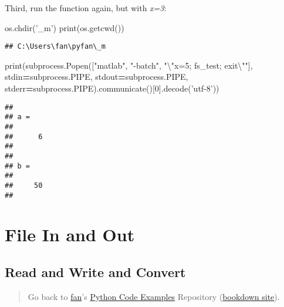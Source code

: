 \documentclass[
]{book}
\newenvironment{Shaded}{\begin{snugshade}}{\end{snugshade}}
\newcommand{\BuiltInTok}[1]{#1}
\newcommand{\CharTok}[1]{\textcolor[rgb]{0.31,0.60,0.02}{#1}}
\newcommand{\DecValTok}[1]{\textcolor[rgb]{0.00,0.00,0.81}{#1}}
\newcommand{\NormalTok}[1]{#1}
\newcommand{\OperatorTok}[1]{\textcolor[rgb]{0.81,0.36,0.00}{\textbf{#1}}}
\newcommand{\StringTok}[1]{\textcolor[rgb]{0.31,0.60,0.02}{#1}}
\begin{document}
Third, run the function again, but with \emph{x=3}:

\begin{Shaded}
\begin{Highlighting}[]
\NormalTok{os.chdir(}\StringTok{'_m'}\NormalTok{)}
\BuiltInTok{print}\NormalTok{(os.getcwd())}
\end{Highlighting}
\end{Shaded}

\begin{verbatim}
## C:\Users\fan\pyfan\_m
\end{verbatim}

\begin{Shaded}
\begin{Highlighting}[]
\BuiltInTok{print}\NormalTok{(subprocess.Popen([}\StringTok{"matlab"}\NormalTok{, }\StringTok{"-batch"}\NormalTok{, }\StringTok{"}\CharTok{\textbackslash{}"}\StringTok{x=5; fs_test; exit}\CharTok{\textbackslash{}"}\StringTok{"}\NormalTok{],}
\NormalTok{                       stdin}\OperatorTok{=}\NormalTok{subprocess.PIPE,}
\NormalTok{                       stdout}\OperatorTok{=}\NormalTok{subprocess.PIPE,}
\NormalTok{                       stderr}\OperatorTok{=}\NormalTok{subprocess.PIPE).communicate()[}\DecValTok{0}\NormalTok{].decode(}\StringTok{'utf-8'}\NormalTok{))}
\end{Highlighting}
\end{Shaded}

\begin{verbatim}
## 
## a =
## 
##      6
## 
## 
## b =
## 
##     50
## 
\end{verbatim}

\hypertarget{file-in-and-out}{%
\section{File In and Out}\label{file-in-and-out}}

\hypertarget{read-and-write-and-convert}{%
\subsection{Read and Write and Convert}\label{read-and-write-and-convert}}

\begin{quote}
Go back to \href{http://fanwangecon.github.io/}{fan}'s \href{https://fanwangecon.github.io/pyfan/}{Python Code Examples} Repository (\href{https://fanwangecon.github.io/pyfan/bookdown}{bookdown site}).
\end{quote}
\end{document}
